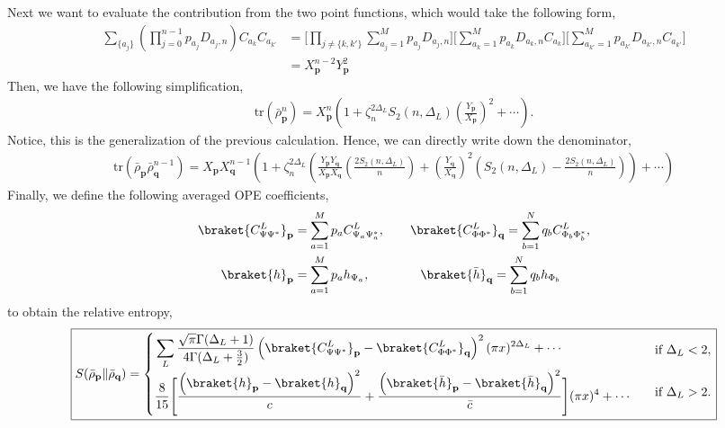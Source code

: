\documentclass[11pt]{article}
\newcommand{\lb}{\left(}
\newcommand{\rb}{\right)}
\begin{document}
Next we want to evaluate the contribution from the two point functions, which would take the following form,
\begin{align}
    \sum_{\{a_j\}} \lb \prod_{j=0}^{n-1}p_{a_j} D_{a_j,n} \rb C_{a_k} C_{a_{k'}} &= \Big[\prod_{j\neq \{k,k'\}}\sum_{a_j = 1}^M p_{a_j}D_{a_j,n} \Big] \Big[ \sum_{a_k = 1}^M p_{a_k} D_{a_k,n} C_{a_k}  \Big]\Big[ \sum_{a_{k'} = 1}^M p_{a_{k'}} D_{a_{k'},n} C_{a_{k'}}  \Big] \\
    &= X_\textbf{p}^{n-2} Y_\textbf{p}^2
\end{align}
Then, we have the following simplification,
\begin{align}
    \text{tr}(\bar{\rho}_\textbf{p}^n) = X_\textbf{p}^n\lb 1+ \zeta_n^{2\Delta_L}S_2(n,\Delta_L) \lb \frac{Y_\textbf{p}}{X_\textbf{p}} \rb^2 + \cdots \rb. 
\end{align}
Notice, this is the generalization of the previous calculation. 
Hence, we can directly write down the denominator,
\begin{align}
    \text{tr} (\bar{\rho}_\textbf{p} \bar{\rho}_\textbf{q}^{n-1}) = X_\textbf{p} X_\textbf{q}^{n-1} \lb 1 + \zeta_n^{2\Delta_L} \lb \frac{Y_\textbf{p} Y_\textbf{q}}{X_\textbf{p}X_\textbf{q}} \lb\frac{2S_2(n,\Delta_L)}{n}\rb + \lb\frac{Y_\textbf{q}}{X_\textbf{q}}\rb^2 \lb S_2(n,\Delta_L) - \frac{2S_2(n,\Delta_L)}{n}\rb \rb  + \cdots \rb
\end{align}
Finally, we define the following averaged OPE coefficients,
\begin{align}
    \braket{C^L_{\Psi \Psi^*}}_\textbf{p} &= \sum_{a=1}^M p_a C_{\Psi_a \Psi_a^*}^L, \qquad \braket{C^L_{\Phi \Phi^*}}_\textbf{q} = \sum_{b=1}^N q_b C_{\Phi_b \Phi_b^*}^L, \\
    \braket{h}_\textbf{p} &= \sum_{a=1}^M p_a h_{\Psi_a}, \qquad  \qquad \braket{\bar{h}}_\textbf{q} = \sum_{b=1}^N q_b h_{\Phi_b}
\end{align}
to obtain the relative entropy,
\begin{align}\label{smallx generalMixture_wrt_mixture}
\boxed{
S(\bar{\rho}_{\textbf{p}} \| \bar{\rho}_{\textbf{q}} )
=
\begin{cases}
\begin{aligned}
&\sum_L\frac{\sqrt{\pi}\Gamma(\Delta_L+1)}
{4\Gamma(\Delta_L+\frac32)}
\lb \braket{C^L_{\Psi \Psi^*}}_\textbf{p} - \braket{C^L_{\Phi \Phi^*}}_\textbf{q}\rb^2 (\pi x)^{2\Delta_L}
+\cdots
\end{aligned}
&
\text{if }\Delta_L < 2,
\\[2ex]
\begin{aligned}
&\frac{8}{15}
\Bigg[
\frac{\lb \braket{h}_\textbf{p} -\braket{h}_\textbf{q}\rb^2}{c} 
+\frac{\lb \braket{\bar h}_\textbf{p}-\braket{\bar h}_\textbf{q}\rb^2}{\bar c}
\Bigg]
(\pi x)^4
+\cdots
\end{aligned}
&
\text{if }\Delta_L>2 .
\end{cases}
}
\end{align}
\end{document}

